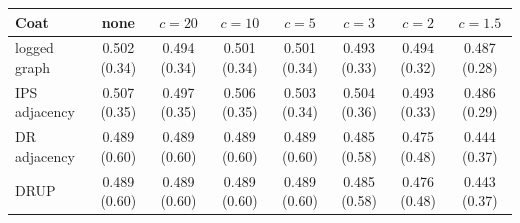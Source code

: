 \begin{tabular}{lccccccc}
\toprule
Coat & none & $c=20$ & $c=10$ & $c=5$ & $c=3$ & $c=2$ & $c=1.5$\\
\midrule
logged graph & 0.502 (0.34) & 0.494 (0.34) & 0.501 (0.34) & 0.501 (0.34) & 0.493 (0.33) & 0.494 (0.32) & 0.487 (0.28)\\
IPS adjacency & 0.507 (0.35) & 0.497 (0.35) & 0.506 (0.35) & 0.503 (0.34) & 0.504 (0.36) & 0.493 (0.33) & 0.486 (0.29)\\
DR adjacency & 0.489 (0.60) & 0.489 (0.60) & 0.489 (0.60) & 0.489 (0.60) & 0.485 (0.58) & 0.475 (0.48) & 0.444 (0.37)\\
DRUP & 0.489 (0.60) & 0.489 (0.60) & 0.489 (0.60) & 0.489 (0.60) & 0.485 (0.58) & 0.476 (0.48) & 0.443 (0.37)\\
\bottomrule
\end{tabular}
